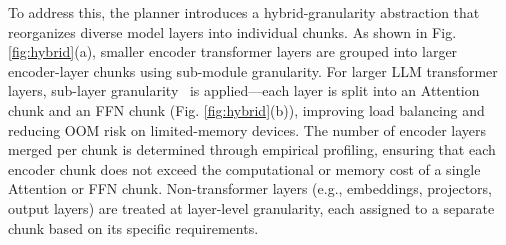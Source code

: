 \documentclass[conference]{IEEEtran}
\begin{document}




To address this, the planner introduces a hybrid-granularity abstraction that reorganizes diverse model layers into individual chunks.
As shown in Fig. \ref{fig:hybrid}(a), smaller encoder transformer layers are grouped into larger encoder-layer chunks using sub-module granularity.
For larger LLM transformer layers, sub-layer granularity~\cite{liu2022autopipe} is applied—each layer is split into an Attention chunk and an FFN chunk (Fig. \ref{fig:hybrid}(b)), improving load balancing and reducing OOM risk on limited-memory devices.
The number of encoder layers merged per chunk is determined through empirical profiling, ensuring that each encoder chunk does not exceed the computational or memory cost of a single Attention or FFN chunk.
Non-transformer layers (e.g., embeddings, projectors, output layers) are treated at layer-level granularity, each assigned to a separate chunk based on its specific requirements.
\end{document}
